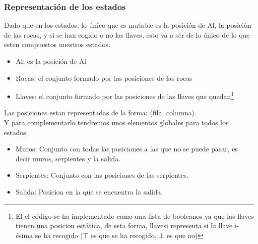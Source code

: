 \documentclass[11pt,spanish]{article}
\begin{document}
			\subsubsection{Representación de los estados}
				Dado que en los estados, lo único que es mutable es la posición de Al, la posición de las rocas, y si se han cogido o no las llaves, esto va a ser de lo único de lo que esten compuestos nuestros estados.
				\begin{itemize}
					\item Al: es la posición de Al
					\item Rocas: el conjunto formado por las posiciones de las rocas
					\item Llaves: el conjunto formado por las posiciones de las llaves que quedan\footnote{El el código se ha implementado como una lista de booleanos ya que las llaves tienen una posicion estática, de esta forma, llavesi representa si la llave i-ésima se ha recogido ($\top$ es que se ha recogido, $\bot$ es que no)}
				\end{itemize}
				Las posiciones estan representadas de la forma: (fila, columna).\\
				Y para complementarlo tendremos unos elementos globales para todos los estados:
				\begin{itemize}
					\item Muros: Conjunto con todas las posiciones a las que no se puede pasar, es decir muros, serpientes y la salida.
					\item Serpientes: Conjunto con las posiciones de las serpientes.
					\item Salida: Posicion en la que se encuentra la salida.
				\end{itemize}
\end{document}
